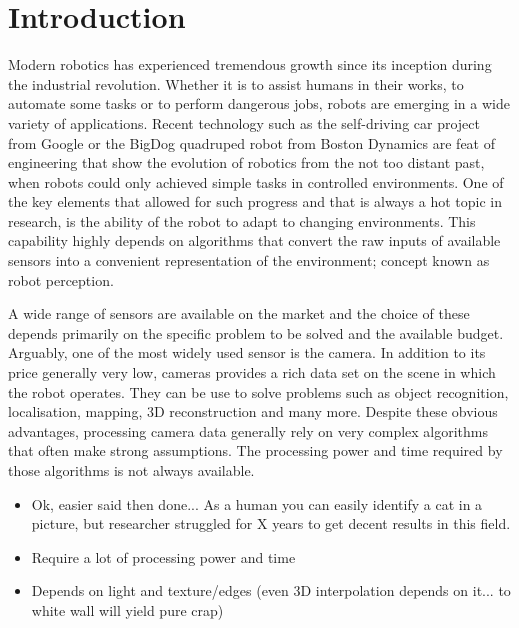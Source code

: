 \chapter*{Introduction}

Modern robotics has experienced tremendous growth since its inception during the industrial revolution. Whether it is to assist humans in their works, to automate some tasks or to perform dangerous jobs, robots are emerging in a wide variety of applications. Recent technology such as the self-driving car project from Google or the BigDog quadruped robot from Boston Dynamics are feat of engineering that show the evolution of robotics from the not too distant past, when robots could only achieved simple tasks in controlled environments. One of the key elements that allowed for such progress and that is always a hot topic in research, is the ability of the robot to adapt to changing environments. This capability highly depends on algorithms that convert the raw inputs of available sensors into a convenient representation of the environment; concept known as robot perception.

A wide range of sensors are available on the market and the choice of these depends primarily on the specific problem to be solved and the available budget. Arguably, one of the most widely used sensor is the camera. In addition to its price generally very low, cameras provides a rich data set on the scene in which the robot operates. They can be use to solve problems such as object recognition, localisation, mapping, 3D reconstruction and many more. Despite these obvious advantages, processing camera data generally rely on very complex algorithms that often make strong assumptions. The processing power and time required by those algorithms is not always available. 



\begin{itemize}
    \item Ok, easier said then done... As a human you can easily identify a cat in a picture, but researcher struggled for X years to get decent results in this field.
    \item Require a lot of processing power and time
    \item Depends on light and texture/edges (even 3D interpolation depends on it... to white wall will yield pure crap)
\end{itemize}

